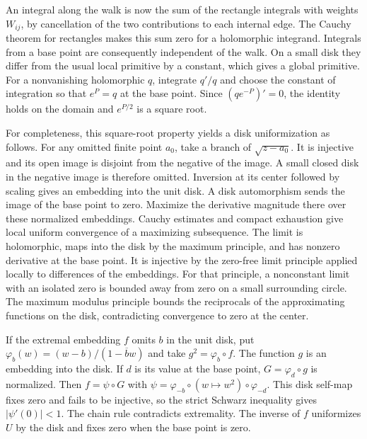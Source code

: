 \documentclass[11pt]{article}
\begin{document}
	An integral along the walk is now the sum of the rectangle integrals
	with weights \(W_{ij}\), by cancellation of the two contributions
	to each internal edge. The Cauchy theorem for rectangles makes this
	sum zero for a holomorphic integrand. Integrals from a base point
	are consequently independent of the walk. On a small disk they
	differ from the usual local primitive by a constant, which gives
	a global primitive. For a nonvanishing holomorphic \(q\), integrate
	\(q'/q\) and choose the constant of integration so that \(e^P=q\)
	at the base point. Since \((qe^{-P})'=0\), the identity holds on
	the domain and \(e^{P/2}\) is a square root.
	
	For completeness, this square-root property yields a disk
	uniformization as follows. For any omitted finite point \(a_0\),
	take a branch of \(\sqrt{z-a_0}\). It is injective and its open
	image is disjoint from the negative of the image. A small closed
	disk in the negative image is therefore omitted. Inversion at its
	center followed by scaling gives an embedding into the unit disk.
	A disk automorphism sends the image of the base point to zero.
	Maximize the derivative magnitude there over these normalized
	embeddings. Cauchy estimates and compact exhaustion give local
	uniform convergence of a maximizing subsequence. The limit is
	holomorphic, maps into the disk by the maximum principle, and has
	nonzero derivative at the base point. It is injective by the
	zero-free limit principle applied locally to differences of the
	embeddings. For that principle, a nonconstant limit with an
	isolated zero is bounded away from zero on a small surrounding
	circle. The maximum modulus principle bounds the reciprocals of
	the approximating functions on the disk, contradicting convergence
	to zero at the center.
	
	If the extremal embedding \(f\) omits \(b\) in the unit disk, put
	\(\varphi_b(w)=(w-b)/(1-\overline b w)\) and take
	\(g^2=\varphi_b\circ f\). The function \(g\) is an embedding into
	the disk. If \(d\) is its value at the base point,
	\(G=\varphi_d\circ g\) is normalized. Then \(f=\psi\circ G\) with
	\(\psi=\varphi_{-b}\circ(w\mapsto w^2)\circ\varphi_{-d}\).
	This disk self-map fixes zero and fails to be injective, so the
	strict Schwarz inequality gives \(|\psi'(0)|<1\). The chain rule
	contradicts extremality. The inverse of \(f\) uniformizes \(U\)
	by the disk and fixes zero when the base point is zero.
	
\end{document}
